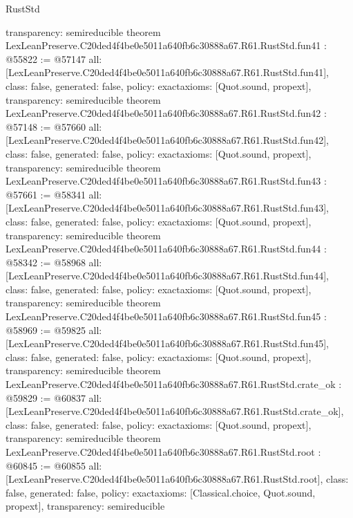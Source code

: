 \begin{lexlean}{RustStd}
\begin{coremodule}
{  transparency: semireducible
}
theorem LexLeanPreserve.C20ded4f4be0e5011a640fb6c30888a67.R61.RustStd.fun41 : @55822 := @57147 {
  all: [LexLeanPreserve.C20ded4f4be0e5011a640fb6c30888a67.R61.RustStd.fun41],
  class: false,
  generated: false,
  policy: exact{axioms: [Quot.sound, propext]},
  transparency: semireducible
}
theorem LexLeanPreserve.C20ded4f4be0e5011a640fb6c30888a67.R61.RustStd.fun42 : @57148 := @57660 {
  all: [LexLeanPreserve.C20ded4f4be0e5011a640fb6c30888a67.R61.RustStd.fun42],
  class: false,
  generated: false,
  policy: exact{axioms: [Quot.sound, propext]},
  transparency: semireducible
}
theorem LexLeanPreserve.C20ded4f4be0e5011a640fb6c30888a67.R61.RustStd.fun43 : @57661 := @58341 {
  all: [LexLeanPreserve.C20ded4f4be0e5011a640fb6c30888a67.R61.RustStd.fun43],
  class: false,
  generated: false,
  policy: exact{axioms: [Quot.sound, propext]},
  transparency: semireducible
}
theorem LexLeanPreserve.C20ded4f4be0e5011a640fb6c30888a67.R61.RustStd.fun44 : @58342 := @58968 {
  all: [LexLeanPreserve.C20ded4f4be0e5011a640fb6c30888a67.R61.RustStd.fun44],
  class: false,
  generated: false,
  policy: exact{axioms: [Quot.sound, propext]},
  transparency: semireducible
}
theorem LexLeanPreserve.C20ded4f4be0e5011a640fb6c30888a67.R61.RustStd.fun45 : @58969 := @59825 {
  all: [LexLeanPreserve.C20ded4f4be0e5011a640fb6c30888a67.R61.RustStd.fun45],
  class: false,
  generated: false,
  policy: exact{axioms: [Quot.sound, propext]},
  transparency: semireducible
}
theorem LexLeanPreserve.C20ded4f4be0e5011a640fb6c30888a67.R61.RustStd.crate_ok : @59829 := @60837 {
  all: [LexLeanPreserve.C20ded4f4be0e5011a640fb6c30888a67.R61.RustStd.crate_ok],
  class: false,
  generated: false,
  policy: exact{axioms: [Quot.sound, propext]},
  transparency: semireducible
}
theorem LexLeanPreserve.C20ded4f4be0e5011a640fb6c30888a67.R61.RustStd.root : @60845 := @60855 {
  all: [LexLeanPreserve.C20ded4f4be0e5011a640fb6c30888a67.R61.RustStd.root],
  class: false,
  generated: false,
  policy: exact{axioms: [Classical.choice, Quot.sound, propext]},
  transparency: semireducible
}


\end{coremodule}
\end{lexlean}
